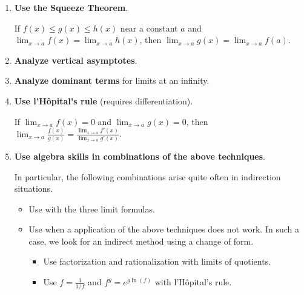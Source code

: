 \documentclass[../main.tex]{subfiles}
\begin{document}
\begin{enumerate}
  \item \textbf{Use the Squeeze Theorem}. 

    If \(f(x) \le g(x) \le h(x)\) near a constant \(a\) and \(\lim_{x \to a} f(x) = \lim_{x \to a} h(x)\), then \(\lim_{x \to a} g(x) = \lim_{x \to a} f(a)\).

  \item \textbf{Analyze vertical asymptotes}.

  \item \textbf{Analyze dominant terms} for limits at an infinity.

  \item \textbf{Use l'H\^opital's rule} (requires differentiation).

    If \(\lim_{x \to a} f(x) = 0\) and \(\lim_{x \to a} g(x) = 0\), then \(\lim_{x \to a} \frac{f(x)}{g(x)} = \frac{\displaystyle \lim_{x \to a} f'(x)}{\displaystyle \lim_{x \to a} g'(x)}\).

  \item \textbf{Use algebra skills in combinations of the above techniques}.

    In particular, the following combinations arise quite often in indirection situations.
    \begin{itemize}
      \item Use  with the three limit formulas.
      \item Use  when a  application of the above techniques does not work. In such a case, we look for an indirect method using a change of form.
        \begin{itemize}
          \item Use factorization and rationalization with limits of quotients.
          \item Use \(f = \frac{1}{1/f}\) and \(f^{g} = e^{g \ln(f)}\) with l'H\^opital's rule.
        \end{itemize}
    \end{itemize}
\end{enumerate}
\end{document}
